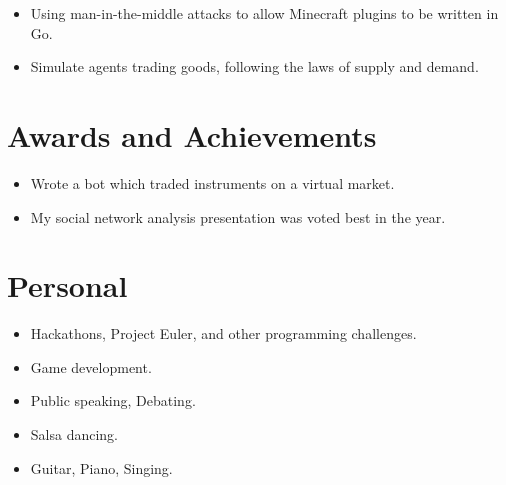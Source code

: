 \documentclass{jcgcv}
\begin{document}
\begin{column}
\begin{itemize}
  \item Using man-in-the-middle attacks to allow Minecraft plugins to be written in Go.
\end{itemize}

\begin{itemize}
  \item Simulate agents trading goods, following the laws of supply and demand.
\end{itemize}



\section{Awards and Achievements}

\begin{itemize}
  \item Wrote a bot which traded instruments on a virtual market.
\end{itemize}

\begin{itemize}
  \item My social network analysis presentation was voted best in the year.
\end{itemize}



\section{Personal}

\begin{itemize}
  \item Hackathons, Project Euler, and other programming challenges.
  \item Game development.
  \item Public speaking, Debating.
  \item Salsa dancing.
  \item Guitar, Piano, Singing.
\end{itemize}



\end{column}
\end{document}
